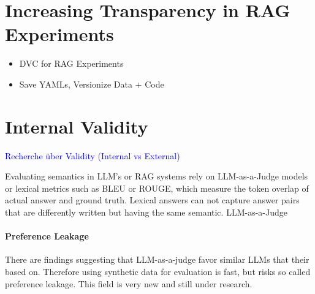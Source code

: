 
\section{Increasing Transparency in RAG Experiments}

\begin{itemize}
    \item DVC for RAG Experiments
    \item Save YAMLs, Versionize Data + Code
\end{itemize}

\section{Internal Validity}

\textcolor{blue}{Recherche über Validity (Internal vs External)}


Evaluating semantics in LLM's or RAG systems rely on LLM-as-a-Judge models or lexical metrics such as BLEU or ROUGE, which measure the token overlap of actual answer and ground truth. Lexical answers can not capture answer pairs that are differently written but having the same semantic. LLM-as-a-Judge 

\paragraph{Preference Leakage}
There are findings suggesting that LLM-as-a-judge favor similar LLMs that their based on. Therefore using synthetic data for evaluation is fast, but risks so called preference leakage.\cite{Li.03.02.2025} This field is very new and still under research. 


